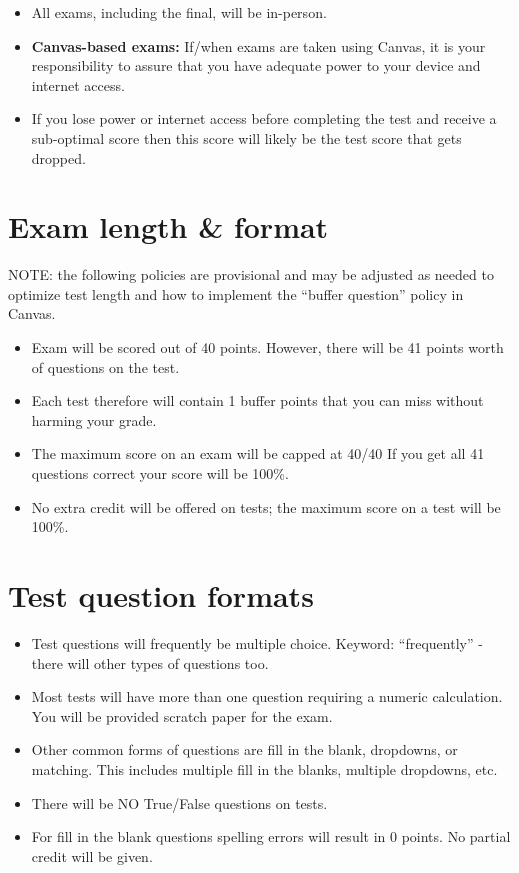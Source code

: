 \documentclass[
]{book}
\providecommand{\tightlist}{%
  \setlength{\itemsep}{0pt}\setlength{\parskip}{0pt}}
\begin{document}
\begin{itemize}
\tightlist
\item
  All exams, including the final, will be in-person.\\
\item
  \textbf{Canvas-based exams:} If/when exams are taken using Canvas, it is your responsibility to assure that you have adequate power to your device and internet access.
\item
  If you lose power or internet access before completing the test and receive a sub-optimal score then this score will likely be the test score that gets dropped.
\end{itemize}

\hypertarget{exam-length-format}{%
\section{Exam length \& format}\label{exam-length-format}}

NOTE: the following policies are provisional and may be adjusted as needed to optimize test length and how to implement the ``buffer question'' policy in Canvas.

\begin{itemize}
\tightlist
\item
  Exam will be scored out of 40 points. However, there will be 41 points worth of questions on the test.
\item
  Each test therefore will contain 1 buffer points that you can miss without harming your grade.
\item
  The maximum score on an exam will be capped at 40/40 If you get all 41 questions correct your score will be 100\%.
\item
  No extra credit will be offered on tests; the maximum score on a test will be 100\%.
\end{itemize}

\hypertarget{test-question-formats}{%
\section{Test question formats}\label{test-question-formats}}

\begin{itemize}
\tightlist
\item
  Test questions will frequently be multiple choice. Keyword: ``frequently'' - there will other types of questions too.
\item
  Most tests will have more than one question requiring a numeric calculation. You will be provided scratch paper for the exam.
\item
  Other common forms of questions are fill in the blank, dropdowns, or matching. This includes multiple fill in the blanks, multiple dropdowns, etc.\\
\item
  There will be NO True/False questions on tests.
\item
  For fill in the blank questions spelling errors will result in 0 points. No partial credit will be given.
\end{itemize}
\end{document}
